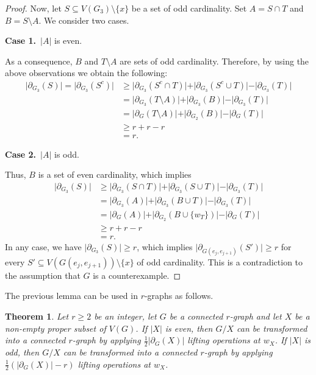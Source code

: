 \documentclass[a4paper,11pt]{article}
\newtheorem{theo}[defi]{Theorem}
\theoremstyle{remark}
\begin{document}
\begin{proof}
	Now, let $S \subseteq V(G_3)\setminus \{x\}$ be a set of odd cardinality. Set $A = S \cap T$ and $B=S \setminus A$. We consider two cases.
	
	{\bf Case 1.}\ $\vert A \vert$ is even.
	
	As a consequence, $B$ and $T \setminus A$ are sets of odd cardinality. Therefore, by using the above observations we obtain the following:
	\begin{align*}
	\vert \partial_{G_3}(S) \vert = \vert \partial_{G_3} (S^c) \vert
	&\geq \vert \partial_{G_3}(S^c\cap T) \vert + \vert \partial_{G_3}(S^c \cup T) \vert - \vert \partial_{G_3}(T) \vert\\
&= \vert \partial_{G_3}(T \setminus A) \vert + \vert \partial_{G_3}(B) \vert - \vert \partial_{G_3}(T) \vert\\
	&=\vert \partial_{G}(T \setminus A) \vert + \vert \partial_{G_2}(B) \vert - \vert \partial_{G}(T) \vert\\
	&\geq r + r - r\\
	&=r.
	\end{align*}
	
	
	{\bf Case 2.}\ $\vert A \vert$ is odd.
	
	Thus, $B$ is a set of even cardinality, which implies
	\begin{align*}
	\vert \partial_{G_3}(S) \vert
	&\geq \vert \partial_{G_3}(S\cap T) \vert + \vert \partial_{G_3}(S \cup T) \vert - \vert \partial_{G_3}(T) \vert\\
	&= \vert \partial_{G_3}(A) \vert + \vert \partial_{G_3}(B \cup T) \vert - \vert \partial_{G_3}(T) \vert\\
	&=\vert \partial_{G}(A) \vert + \vert \partial_{G_2}(B \cup \{w_{T}\}) \vert - \vert \partial_{G}(T) \vert\\
	&\geq r + r - r\\
	&=r.
	\end{align*}
	In any case, we have $\vert \partial_{G_3}(S) \vert \geq r$, which implies $ \vert \partial_{G(e_j,e_{j+1})}(S') \vert\geq r $ for every $ S'\subseteq V(G(e_j,e_{j+1}))\setminus\{x\}$ of odd cardinality. This is a  contradiction to the assumption that $G$ is a counterexample.	
\end{proof}

The previous lemma can be used in $r$-graphs as follows.

\begin{theo}
	\label{theo:r-graph_lifting}
	Let $r\geq 2$ be an integer, let $G$ be a connected $r$-graph and let $X$ be a non-empty proper subset of $V(G)$. If $\vert X \vert$ is even, then $G/X$ can be transformed into a connected $r$-graph by  applying $\frac{1}{2}\left \vert \partial_G(X)\right|$ lifting operations at $w_X$. If $\vert X \vert$ is odd, then $G/X$ can be transformed into a connected $r$-graph by applying $\frac{1}{2}\left( \vert \partial_G(X) \vert - r \right)$ lifting operations at $w_X$.
\end{theo}
\end{document}
